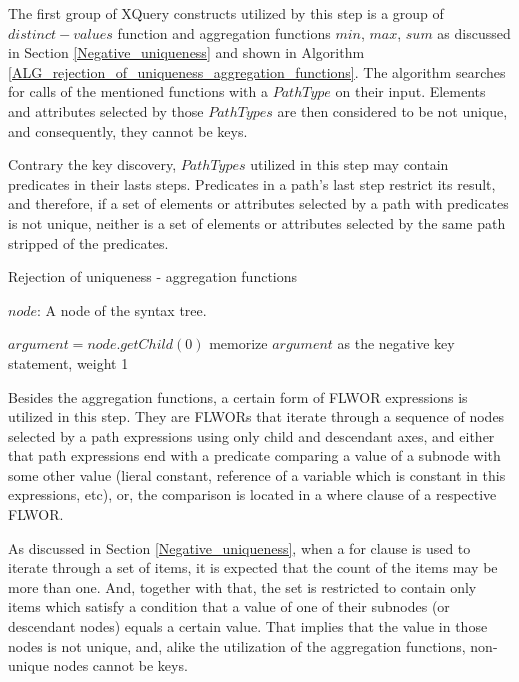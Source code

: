 The first group of XQuery constructs utilized by this step is a group of $distinct-values$ function and aggregation functions $min$, $max$, $sum$ as discussed in Section \ref{Negative_uniqueness} and shown in Algorithm \ref{ALG_rejection_of_uniqueness_aggregation_functions}. The algorithm searches for calls of the mentioned functions with a $PathType$ on their input. Elements and attributes selected by those $PathTypes$ are then considered to be not unique, and consequently, they cannot be keys.

Contrary the key discovery, $PathTypes$ utilized in this step may contain predicates in their lasts steps. Predicates in a path's last step restrict its result, and therefore, if a set of elements or attributes selected by a path with predicates is not unique, neither is a set of elements or attributes selected by the same path stripped of the predicates.

\begin{algorithm}
\caption{Rejection of uniqueness - aggregation functions}
\label{ALG_rejection_of_uniqueness_aggregation_functions}
\begin{algorithmic}[1]
\REQUIRE $node$: A node of the syntax tree.

        \STATE $argument = node.getChild(0)$
            \STATE memorize $argument$ as the negative key statement, weight 1
        \ENDIF
    \ENDIF
\ENDIF
\end{algorithmic}
\end{algorithm}

Besides the aggregation functions, a certain form of FLWOR expressions is utilized in this step. They are FLWORs that iterate through a sequence of nodes selected by a path expressions using only child and descendant axes, and either that path expressions end with a predicate comparing a value of a subnode with some other value (lieral constant, reference of a variable which is constant in this expressions, etc), or, the comparison is located in a where clause of a respective FLWOR.

As discussed in Section \ref{Negative_uniqueness}, when a for clause is used to iterate through a set of items, it is expected that the count of the items may be more than one. And, together with that, the set is restricted to contain only items which satisfy a condition that a value of one of their subnodes (or descendant nodes) equals a certain value. That implies that the value in those nodes is not unique, and, alike the utilization of the aggregation functions, non-unique nodes cannot be keys.


